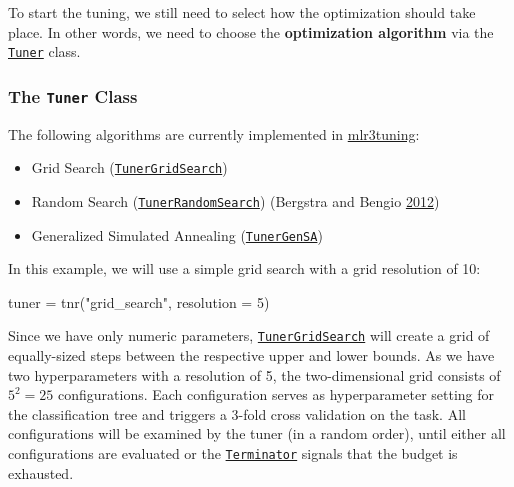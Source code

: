 \documentclass[]{article}
\newenvironment{Shaded}{}{}
\newcommand{\DataTypeTok}[1]{#1}
\newcommand{\DecValTok}[1]{#1}
\newcommand{\KeywordTok}[1]{\textcolor[rgb]{0.00,0.00,1.00}{#1}}
\newcommand{\NormalTok}[1]{#1}
\newcommand{\StringTok}[1]{\textcolor[rgb]{0.00,0.50,0.50}{#1}}
\providecommand{\tightlist}{%
  \setlength{\itemsep}{0pt}\setlength{\parskip}{0pt}}
\renewenvironment{Shaded} {\begin{snugshade}\small} {\end{snugshade}}
\begin{document}
To start the tuning, we still need to select how the optimization should take place.
In other words, we need to choose the \textbf{optimization algorithm} via the \href{https://mlr3tuning.mlr-org.com/reference/Tuner.html}{\texttt{Tuner}} class.

\hypertarget{the-tuner-class}{%
\subsubsection{\texorpdfstring{The \texttt{Tuner} Class}{The Tuner Class}}\label{the-tuner-class}}

The following algorithms are currently implemented in \href{https://mlr3tuning.mlr-org.com}{mlr3tuning}:

\begin{itemize}
\tightlist
\item
  Grid Search (\href{https://mlr3tuning.mlr-org.com/reference/mlr_tuners_grid_search.html}{\texttt{TunerGridSearch}})
\item
  Random Search (\href{https://mlr3tuning.mlr-org.com/reference/mlr_tuners_random_search.html}{\texttt{TunerRandomSearch}}) (Bergstra and Bengio \protect\hyperlink{ref-bergstra2012}{2012})
\item
  Generalized Simulated Annealing (\href{https://mlr3tuning.mlr-org.com/reference/mlr_tuners_gensa.html}{\texttt{TunerGenSA}})
\end{itemize}

In this example, we will use a simple grid search with a grid resolution of 10:

\begin{Shaded}
\begin{Highlighting}[]
\NormalTok{tuner =}\StringTok{ }\KeywordTok{tnr}\NormalTok{(}\StringTok{"grid_search"}\NormalTok{, }\DataTypeTok{resolution =} \DecValTok{5}\NormalTok{)}
\end{Highlighting}
\end{Shaded}

Since we have only numeric parameters, \href{https://mlr3tuning.mlr-org.com/reference/mlr_tuners_grid_search.html}{\texttt{TunerGridSearch}} will create a grid of equally-sized steps between the respective upper and lower bounds.
As we have two hyperparameters with a resolution of 5, the two-dimensional grid consists of \(5^2 = 25\) configurations.
Each configuration serves as hyperparameter setting for the classification tree and triggers a 3-fold cross validation on the task.
All configurations will be examined by the tuner (in a random order), until either all configurations are evaluated or the \href{https://mlr3tuning.mlr-org.com/reference/Terminator.html}{\texttt{Terminator}} signals that the budget is exhausted.
\end{document}
